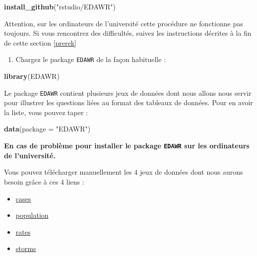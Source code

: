 \documentclass[a4paperpaper,]{article}
\newenvironment{Shaded}{\begin{snugshade}}{\end{snugshade}}
\newcommand{\KeywordTok}[1]{\textcolor[rgb]{0.13,0.29,0.53}{\textbf{#1}}}
\newcommand{\DataTypeTok}[1]{\textcolor[rgb]{0.13,0.29,0.53}{#1}}
\newcommand{\StringTok}[1]{\textcolor[rgb]{0.31,0.60,0.02}{#1}}
\newcommand{\NormalTok}[1]{#1}
\providecommand{\tightlist}{%
  \setlength{\itemsep}{0pt}\setlength{\parskip}{0pt}}
\theoremstyle{definition}
\theoremstyle{definition}
\theoremstyle{definition}
\theoremstyle{remark}
\begin{document}
\begin{Shaded}
\begin{Highlighting}[]
\KeywordTok{install_github}\NormalTok{(}\StringTok{"rstudio/EDAWR"}\NormalTok{)}
\end{Highlighting}
\end{Shaded}

Attention, sur les ordinateurs de l'université cette procédure ne
fonctionne pas toujours. Si vous rencontrez des difficultés, suivez les
instructions décrites à la fin de cette section \ref{prerek}

\begin{enumerate}
\def\labelenumi{\arabic{enumi}.}
\setcounter{enumi}{2}
\tightlist
\item
  Chargez le package \texttt{EDAWR} de la façon habituelle :
\end{enumerate}

\begin{Shaded}
\begin{Highlighting}[]
\KeywordTok{library}\NormalTok{(EDAWR)}
\end{Highlighting}
\end{Shaded}

Le package \texttt{EDAWR} contient plusieurs jeux de données dont nous
allons nous servir pour illustrer les questions liées au format des
tableaux de données. Pour en avoir la liste, vous pouvez taper :

\begin{Shaded}
\begin{Highlighting}[]
\KeywordTok{data}\NormalTok{(}\DataTypeTok{package =} \StringTok{"EDAWR"}\NormalTok{)}
\end{Highlighting}
\end{Shaded}

\textbf{En cas de problème pour installer le package \texttt{EDAWR} sur
les ordinateurs de l'université.}

Vous pouvez télécharger manuellement les 4 jeux de données dont nous
aurons besoin grâce à ces 4 liens :

\begin{itemize}
\tightlist
\item
  \href{data/cases.rdata}{cases}
\item
  \href{data/population.rdata}{population}
\item
  \href{data/rates.rdata}{rates}
\item
  \href{data/storms.rdata}{storms}
\end{itemize}
\end{document}

